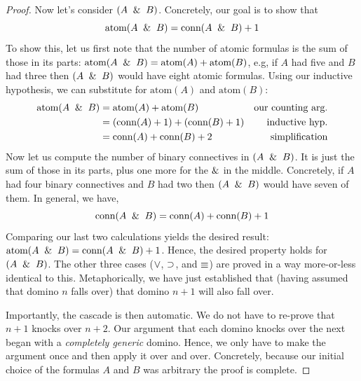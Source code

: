 \documentclass[options]{philosophersimprint}
\begin{document}
\begin{proof}
Now let's consider $(A \ \mathbin{\&} \  B)$. Concretely, our goal is to show that
$$\text{atom}(A \ \mathbin{\&} \  B)=\text{conn}(A \ \mathbin{\&} \  B) +1$$
To show this, let us first note that the number of atomic formulas is the sum of those in its parts: $\text{atom}(A \ \mathbin{\&} \  B) = \text{atom}(A) + \text{atom}(B)$, e.g, if $A$ had five and $B$ had three then $(A \ \mathbin{\&} \  B)$ would have eight atomic formulas. Using our inductive hypothesis, we can substitute for $\text{atom}(A)$ and $\text{atom}(B)$:
\begin{align}
\nonumber
\text{atom}(A \ \mathbin{\&} \  B) &= \text{atom}(A) + \text{atom}(B) & \text{our counting arg.}\\
\nonumber
&=(\text{conn}(A) + 1) + (\text{conn}(B) + 1) & \text{inductive hyp.}\\
\nonumber
&= \text{conn}(A) + \text{conn}(B) + 2    & \text{simplification}
\end{align}
Now let us compute the number of binary connectives in $(A \ \mathbin{\&} \  B)$. It is just the sum of those in its parts, plus one more for the $\mathbin{\&}$ in the middle. Concretely, if $A$ had four binary connectives and $B$ had two then $(A \ \mathbin{\&} \  B)$ would have seven of them. In general, we have,
$$\text{conn}(A \ \mathbin{\&} \  B) = \text{conn}(A) + \text{conn}(B) + 1$$
Comparing our last two calculations yields the desired result: $\text{atom}(A \ \mathbin{\&} \  B)=\text{conn}(A \ \mathbin{\&} \  B) +1$. Hence, the desired property holds for $(A \ \mathbin{\&} \  B)$. The other three cases ($\mathbin{\vee}$, $\mathbin{\supset}$, and $\mathbin{\equiv}$) are proved in a way more-or-less identical to this. Metaphorically, we have just established that (having assumed that domino $n$ falls over) that domino $n+1$ will also fall over.

Importantly, the cascade is then automatic. We do not have to re-prove that $n+1$ knocks over $n+2$. Our argument that each domino knocks over the next began with a \textit{completely generic} domino. Hence, we only have to make the argument once and then apply it over and over. Concretely, because our initial choice of the formulas $A$ and $B$ was arbitrary the proof is complete.
\end{proof}
\end{document}
